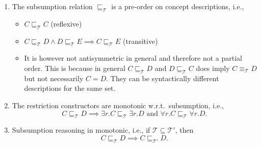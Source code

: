 \begin{lemma}
	\begin{enumerate}
		\item The subsumption relation $\sqsubseteq_{\mathcal{T}}$ is a pre-order on concept descriptions, i.e.,
			\begin{itemize}
				\item $C \sqsubseteq_{\mathcal{T}}C$ (reflexive)
				\item $C \sqsubseteq_{\mathcal{T}} D \land D \sqsubseteq_{\mathcal{T}} E \implies C \sqsubseteq_{\mathcal{T}} E$ (transitive)
				\item It is however not antisymmetric in general and therefore not a partial order.
					This is because in general $C \sqsubseteq_{\mathcal{T}} D$ and $D \sqsubseteq_{\mathcal{T}} C$
					does imply $C \equiv_{\mathcal{T}} D$ but not necessarily $C = D$.
					They can be syntactically different descriptions for the same set.
			\end{itemize}
		\item The restriction constructors are monotonic w.r.t.\ subsumption, i.e.,
			\[
			C \sqsubseteq_{\mathcal{T}} D \implies \exists r.C \sqsubseteq_{\mathcal{T}} \exists r.D \text{ and } \forall r.C \sqsubseteq_{\mathcal{T}} \forall r.D
			.\] 
		\item Subsumption reasoning in monotonic, i.e., if $\mathcal{T} \subseteq  \mathcal{T}'$, then
			\[
				C \sqsubseteq_{\mathcal{T}} D \implies C \sqsubseteq_{\mathcal{T}'} D
			.\] 
	\end{enumerate}
\end{lemma}
